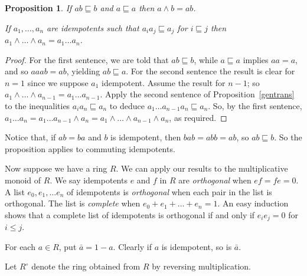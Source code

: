 \documentclass[a4paper,12pt,reqno]{amsart}
\newtheorem{proposition}[theorem]{Proposition}
\theoremstyle{definition}
\theoremstyle{fact}
\theoremstyle{genquest}
\theoremstyle{step}
\begin{document}
\begin{proposition}\label{someets}
If $ab\sqsubseteq b$ and $a\sqsubseteq a$ then $a\wedge b = ab$.

If $a_1, \dots , a_n$ are idempotents such that $a_ia_j\sqsubseteq a_j$ for $i\sqsubseteq j$
then $a_1\wedge \dots \wedge a_n = a_1 \dots a_n$. 
\end{proposition}
\begin{proof}
For the first sentence, we are told that $ab\sqsubseteq b$, while $a\sqsubseteq a$ implies $aa=a$,
and so $aaab=ab$, yielding $ab\sqsubseteq a$.
For the second sentence the result is clear for $n=1$ since we suppose $a_1$
idempotent. Assume the result for $n-1$; so $a_1\wedge \dots \wedge a_{n-1} = a_1 \dots a_{n-1}$. Apply the second sentence of Proposition~\ref{gentrans} to the inequalities $a_ia_n\sqsubseteq a_n$ to deduce $a_1\dots a_{n-1}a_n\sqsubseteq a_n$.
So, by the first sentence, $a_1\dots a_n = a_1\dots a_{n-1}\wedge a_n = a_1\wedge \dots \wedge a_{n-1}\wedge a_n$, as required.
\end{proof}

Notice that, if $ab=ba$ and $b$ is idempotent, then $bab=abb=ab$, so $ab\sqsubseteq b$.
So the proposition applies to commuting idempotents.

Now suppose we have a ring $R$. We can apply our results to the multiplicative monoid of $R$. 
We say idempotents $e$ and $f$ in $R$ are {\em orthogonal}
when $ef=fe=0$. A list $e_0, e_1, \dots e_n$ of idempotents is {\em orthogonal}
when each pair in the list is orthogonal. The list is {\em complete} when
$e_0+ e_1+ \dots + e_n = 1$. An easy induction shows that a complete
list of idempotents is orthogonal if and only if $e_ie_j = 0$ for $i\le j$.
 
For each $a\in R$, put $\bar{a}=1-a$. Clearly if $a$ is idempotent, so is $\bar{a}$.

Let $R^{\circ}$ denote the ring obtained from $R$ by reversing multiplication.
\end{document}
